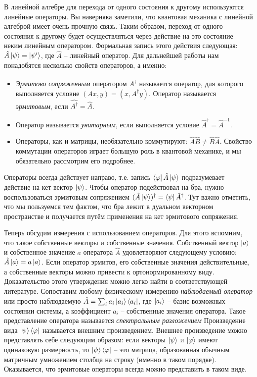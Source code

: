 В линейной алгебре для перехода от одного состояния к другому используются линейные операторы. Вы наверняка заметили, что квантовая механика с линейной алгеброй имеет очень прочную связь. Таким образом, переход от одного состояния к другому будет осуществляться через действие на это состояние неким линейным оператором. Формальная запись этого действия следующая: $\hat{A} \ket{\psi} = \ket{\psi'}$, где $\hat{A}$ -- линейный оператор. Для дальнейшей работы нам понадобятся несколько свойств операторов, а именно:
\begin{itemize}
    \item \textit{Эрмитово сопряженным} оператором $\hat{A^{\dagger}}$ называется оператор, для которого выполняется условие $(Ax, y) = (x, A^{\dagger}y)$. Оператор называется \textit{эрмитовым}, если $\hat{A^{\dagger}} = \hat{A}$.
    \item Оператор называется \textit{унитарным}, если выполняется условие $\hat{A}^{\dagger} = \hat{A}^{-1}$.
    \item Операторы, как и матрицы, необязательно коммутируют: $\hat{A}\hat{B} \neq \hat{B}\hat{A}$. Свойство коммутации операторов играет большую роль в квантовой механике, и мы обязательно рассмотрим его подробнее.
\end{itemize}
Операторы всегда действует направо, т.е. запись $\bra{\varphi}\hat{A}\ket{\psi}$ подразумевает действие на кет вектор $\ket{\psi}$. Чтобы оператор подействовал на бра, нужно воспользоваться эрмитовым сопряжением $(\hat{A}\ket{\psi})^{\dagger} = \bra{\psi}\hat{A}^{\dagger}$. Тут важно отметить, что мы пользуемся тем фактом, что бра лежит в дуальном векторном пространстве и получается путём применения на кет эрмитового сопряжения.

Теперь обсудим измерения с использованием операторов. Для этого вспомним, что такое собственные векторы и собственные значения. Собственный вектор $\ket{a}$ и собственное значение $a$ оператора $\hat{A}$ удовлетворяют следующему условию: $\hat{A}\ket{a} = a\ket{a}$. Если оператор эрмитов, его собственные значения действительные, а собственные векторы можно привести к ортонормированному виду. Доказательство этого утверждения можно легко найти в соответствующей литературе. Сопоставим любому физическому измерению \textit{наблюдаемый оператор} или просто наблюдаемую $\hat{A} = \sum_i a_i \ket{a_i}\bra{a_i}$, где  $\ket{a_i}$ -- базис возможных состоянии системы, а коэффициент $a_i$ -- собственные значения оператора. Такое представление оператора называется \textit{спектральным разложением} Произведение вида $\ket{\psi}\bra{\varphi}$ называется внешним произведением. Внешнее произведение можно представлять себе следующим образом: если векторы $\ket{\psi}$ и $\ket{\varphi}$ имеют одинаковую размерность, то $\ket{\psi}\bra{\varphi}$ -- это матрица, образованная обычным матричным умножением столбца на строку (именно в таком порядке). Оказывается, что эрмитовые операторы всегда можно представить в таком виде.

